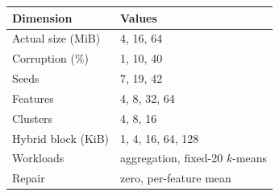 \begin{tabular}{ll}
\toprule
Dimension & Values \\
\midrule
Actual size (MiB) & 4, 16, 64 \\
Corruption (\%) & 1, 10, 40 \\
Seeds & 7, 19, 42 \\
Features & 4, 8, 32, 64 \\
Clusters & 4, 8, 16 \\
Hybrid block (KiB) & 1, 4, 16, 64, 128 \\
Workloads & aggregation, fixed-20 $k$-means \\
Repair & zero, per-feature mean \\
\bottomrule
\end{tabular}
